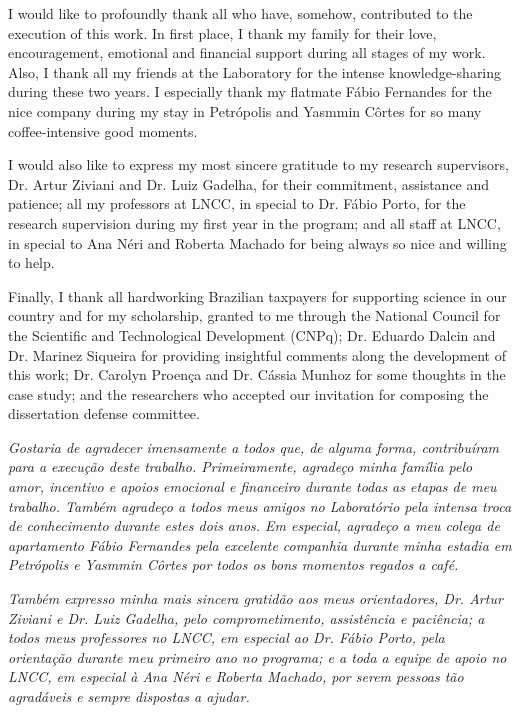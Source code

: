 \documentclass[
	12pt,				%
	openright,			%
	oneside,			%
	a4paper,			%
	sumario=tradicional,%
	french,				%
	spanish,			%
	brazil,				%
    english
	]{abntex2}
\begin{document}
\begin{agradecimentos}
I would like to profoundly thank all who have, somehow, contributed to the execution of this work.
In first place, I thank my family for their love, encouragement, emotional and financial support during all stages of my work.
Also, I thank all my friends at the Laboratory for the intense knowledge-sharing during these two years.
I especially thank my flatmate Fábio Fernandes for the nice company during my stay in Petrópolis and 
Yasmmin Côrtes for so many coffee-intensive good moments.

I would also like to express my most sincere gratitude to my research supervisors, Dr. Artur Ziviani and Dr. Luiz Gadelha, for their commitment, assistance and patience;
all my professors at LNCC, in special to Dr. Fábio Porto, for the research supervision during my first year in the program;
and all staff at LNCC, in special to Ana Néri and Roberta Machado for being always so nice and willing to help.

Finally, I thank all hardworking Brazilian taxpayers for supporting science in our country and for my scholarship, granted to me through the National Council for the Scientific and Technological Development (CNPq); Dr. Eduardo Dalcin and Dr. Marinez Siqueira for providing insightful comments along the development of this work; Dr. Carolyn Proença and Dr. Cássia Munhoz for some thoughts in the case study; and the researchers who accepted our invitation for composing the dissertation defense committee. 
\\[.2\baselineskip]

\begin{footnotesize}
\textit{Gostaria de agradecer imensamente a todos que, de alguma forma, contribuíram para a execução deste trabalho.
Primeiramente, agradeço minha família pelo amor, incentivo e apoios emocional e financeiro durante todas as etapas de meu trabalho.
Também agradeço a todos meus amigos no Laboratório pela intensa troca de conhecimento durante estes dois anos.
Em especial, agradeço a meu colega de apartamento Fábio Fernandes pela excelente companhia durante minha estadia em Petrópolis e
Yasmmin Côrtes por todos os bons momentos regados a café.}

\textit{Também expresso minha mais sincera gratidão aos meus orientadores, Dr. Artur Ziviani e Dr. Luiz Gadelha, pelo comprometimento, assistência e paciência;
a todos meus professores no LNCC, em especial ao Dr. Fábio Porto, pela orientação durante meu primeiro ano no programa;
e a toda a equipe de apoio no LNCC, em especial à Ana Néri e Roberta Machado, por serem pessoas tão agradáveis e sempre dispostas a ajudar.}



\end{footnotesize}
\end{agradecimentos}
\end{document}
